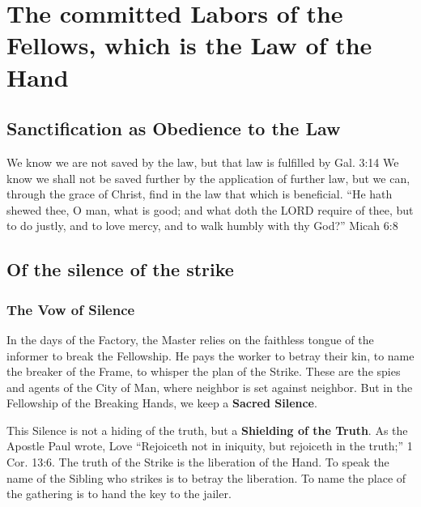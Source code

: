 \section{The committed Labors of the Fellows, which is the Law of the Hand}
\subsection{Sanctification as Obedience to the Law}
\pstart
We know we are not saved by the law, but that law is fulfilled by  {Gal. 3:14}
We know we shall not be saved further by the application of further law, but we can, through the grace of Christ, find in the law that which is beneficial.
``He hath shewed thee, O man, what is good; and what doth the LORD require of thee, but to do justly, and to love mercy, and to walk humbly with thy God?'' {Micah 6:8}
\pend

\subsection{Of the silence of the strike}
\subsubsection{The Vow of Silence}
\pstart
In the days of the Factory, the Master relies on the faithless tongue of the informer to break the Fellowship.
He pays the worker to betray their kin, to name the breaker of the Frame, to whisper the plan of the Strike.
These are the spies and agents of the City of Man, where neighbor is set against neighbor. But in the Fellowship of the Breaking Hands, we keep a \textbf{Sacred Silence}.
\pend

\pstart
This Silence is not a hiding of the truth, but a \textbf{Shielding of the Truth}. As the Apostle Paul wrote, Love ``Rejoiceth not in iniquity, but rejoiceth in the truth;'' {1 Cor. 13:6}.
The truth of the Strike is the liberation of the Hand.
To speak the name of the Sibling who strikes is to betray the liberation.
To name the place of the gathering is to hand the key to the jailer.
\pend

